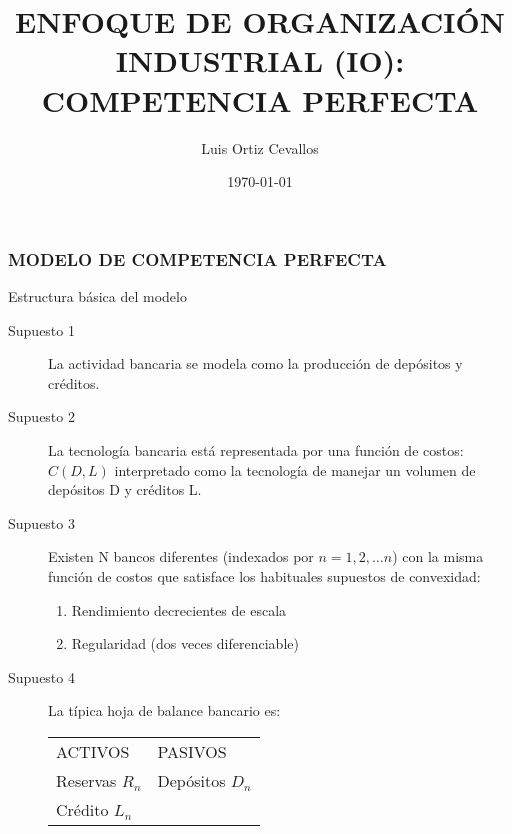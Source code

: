 \documentclass[10pt, xcolor=table, x11names]{beamer}
\title[]{ENFOQUE DE ORGANIZACIÓN INDUSTRIAL (IO): COMPETENCIA PERFECTA}
\author[Luis Ortiz]{Luis Ortiz Cevallos}
\institute[SECMCA]{\bf SECMCA}
\date[\today]{\footnotesize \today}
\begin{document}
\begin{frame}
\titlepage
\end{frame}


\begin{frame}
    \frametitle{{\normalsize MODELO DE COMPETENCIA PERFECTA} {}}
    
    \begin{block} {Estructura básica del modelo}
        \begin{description}
            \item[Supuesto 1]  La actividad bancaria se modela como la producción de depósitos y créditos.
            \item[Supuesto 2] La tecnología bancaria está representada por una función de costos: $C(D,L)$ interpretado como la tecnología de manejar un volumen de depósitos D y créditos L.
            \item[Supuesto 3] Existen N bancos diferentes (indexados por $n=1, 2, \ldots n$) con la misma función de costos que satisface los habituales supuestos de convexidad:
            \begin{enumerate}
                \item Rendimiento decrecientes de escala 
                \item Regularidad (dos veces diferenciable)
            \end{enumerate}
            \item[Supuesto 4] La típica hoja de balance bancario es:
              \begin{table}[htbp]
            \centering
             \begin{tabular}{ll}
                ACTIVOS & PASIVOS \\
                Reservas $R_{n}$ & Depósitos $D_{n}$ \\
                Crédito  $L_{n}$ &  \\
            \end{tabular}%
            \end{table}%
            
                 
        \end{description}
        
    \end{block}	
    
\end{frame}
\end{document}
